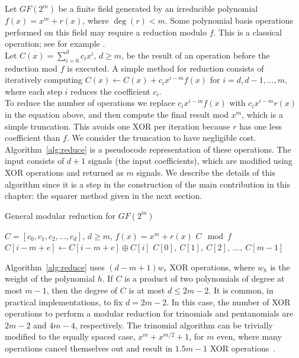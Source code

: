 Let $GF(2^m)$ be a finite field generated by an irreducible polynomial $f(x) = x^m + r(x)$, where $\deg(r) < m$. Some polynomial basis operations performed on this field may require a reduction modulo $f$. This is a classical operation; see for example \cite[Chapter~2.3.5]{hankerson2006guide}.\\

Let $C(x) = \sum_{i=0}^{d} c_i x^i$, $d \geq m$, be the result of an operation before the reduction mod $f$ is executed. A simple method for reduction consists of iteratively computing $C(x) \leftarrow C(x) + c_{i} x^{i-m} f(x)$ for $i = d, d-1, \ldots, m$, where each step $i$ reduces the coefficient $c_{i}$.\\

To reduce the number of operations we replace $c_{i} x^{i-m} f(x)$ with $c_{i} x^{i-m} r(x)$ in the equation above, and then compute the final result mod $x^m$, which is a simple truncation. This avoids one XOR per iteration because $r$ has one less coefficient than $f$. We consider the truncation to have negligible cost. Algorithm~\ref{alg:reduce} is a pseudocode representation of these operations. The input consists of $d+1$ signals (the input coefficients), which are modified using XOR operations and returned as $m$ signals. We describe the details of this algorithm since it is a step in the construction of the main contribution in this chapter: the squarer method given in the next section.

\begin{algorithm}
\caption{General modular reduction for $GF(2^m)$}
\label{alg:reduce}
\begin{algorithmic}[1]
\REQUIRE $C = [c_0, c_1, c_2, ..., c_d]$, $d \geq m$, $f(x) = x^m + r(x)$
\ENSURE $C \mod f$
\STATE $C[i-m+e] \leftarrow C[i-m+e] \oplus C[i]$ \label{alg:reduce:op}
\ENDFOR
\ENDFOR
\RETURN $C[0],~C[1],~C[2],~\ldots,~C[m-1]$
\end{algorithmic}
\end{algorithm}

Algorithm~\ref{alg:reduce} uses $(d-m+1)w_r$ XOR operations, where $w_h$ is the weight of the polynomial $h$. If $C$ is a product of two polynomials of degree at most $m-1$, then the degree of $C$ is at most $d \leq 2m-2$. It is common, in practical implementations, to fix $d=2m-2$. In this case, the number of XOR operations to perform a modular reduction for trinomials and pentanomials are $2m-2$ and $4m-4$, respectively. The trinomial algorithm can be trivially modified to the equally spaced case, $x^m+x^{m/2}+1$, for $m$ even, where many operations cancel themselves out and result in $1.5 m - 1$ XOR operations~\cite{wu2002bit}.\\

